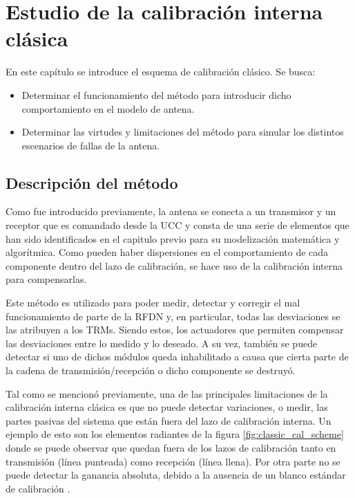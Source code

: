
\chapter{Estudio de la calibración interna clásica}
\label{ch:classicalCalibration}

En este capítulo se introduce el esquema de calibración clásico. Se busca:
\begin{itemize}
	\item Determinar el funcionamiento del método para introducir dicho comportamiento en el modelo de antena. 
	\item Determinar las virtudes y limitaciones del método para simular los distintos escenarios de fallas de la antena.
\end{itemize}


\section{Descripción del método}

Como fue introducido previamente, la antena se conecta a un transmisor y un receptor que es comandado desde la UCC y consta de
una serie de elementos que han sido identificados en el capitulo previo para su modelización matemática y algorítmica. Como 
pueden haber dispersiones en el comportamiento de cada componente dentro del lazo de calibración, se hace uso de la calibración
interna para compensarlas. 

Este método es utilizado para poder medir, detectar y corregir el mal funcionamiento de parte de la RFDN y, en particular, todas
las desviaciones se las atribuyen a los TRMs. Siendo estos, los actuadores que permiten compensar las desviaciones entre lo medido
y lo deseado. A su vez, también se puede detectar si uno de dichos módulos queda inhabilitado a causa que cierta parte de la
cadena de transmisión/recepción o dicho componente se destruyó.

Tal como se mencionó previamente, una de las principales limitaciones de la calibración interna clásica es que no puede
detectar variaciones, o medir, las partes pasivas del sistema que están fuera del lazo de calibración interna. Un ejemplo de
esto son los elementos radiantes de la figura \ref{fig:classic_cal_scheme} donde se puede observar que quedan fuera de los lazos
de calibración tanto en transmisión (línea punteada) como recepción (línea llena). Por otra parte no se puede detectar la
ganancia absoluta, debido a la ausencia de un blanco estándar de calibración \cite{Wang2010}.

